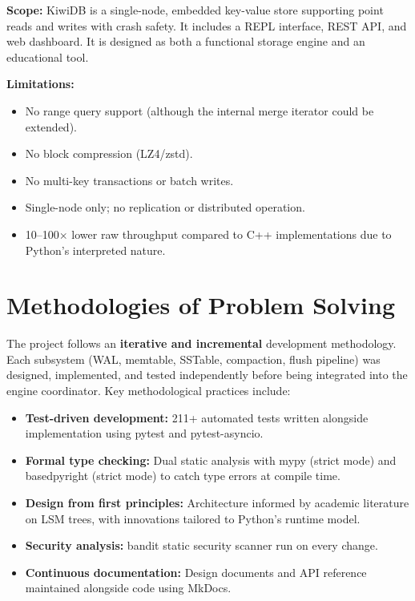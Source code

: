 \documentclass[oneside,a4paper,12pt]{book}
\begin{document}
\textbf{Scope:} KiwiDB is a single-node, embedded key-value store supporting point reads and writes with crash safety. It includes a REPL interface, REST API, and web dashboard. It is designed as both a functional storage engine and an educational tool.

\textbf{Limitations:}
\begin{itemize}[leftmargin=2em]
    \item No range query support (although the internal merge iterator could be extended).
    \item No block compression (LZ4/zstd).
    \item No multi-key transactions or batch writes.
    \item Single-node only; no replication or distributed operation.
    \item 10--100$\times$ lower raw throughput compared to C++ implementations due to Python's interpreted nature.
\end{itemize}

\section{Methodologies of Problem Solving}

The project follows an \textbf{iterative and incremental} development methodology. Each subsystem (WAL, memtable, SSTable, compaction, flush pipeline) was designed, implemented, and tested independently before being integrated into the engine coordinator. Key methodological practices include:

\begin{itemize}[leftmargin=2em]
    \item \textbf{Test-driven development:} 211+ automated tests written alongside implementation using pytest and pytest-asyncio.
    \item \textbf{Formal type checking:} Dual static analysis with mypy (strict mode) and basedpyright (strict mode) to catch type errors at compile time.
    \item \textbf{Design from first principles:} Architecture informed by academic literature on LSM trees, with innovations tailored to Python's runtime model.
    \item \textbf{Security analysis:} bandit static security scanner run on every change.
    \item \textbf{Continuous documentation:} Design documents and API reference maintained alongside code using MkDocs.
\end{itemize}
\end{document}
